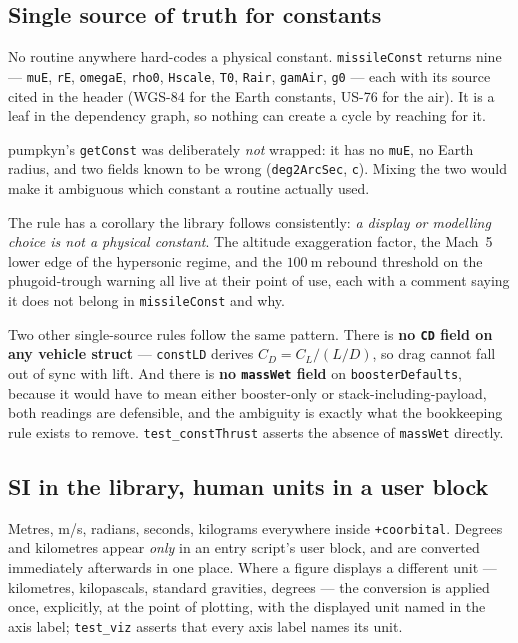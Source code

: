 \documentclass[11pt]{article}
\newcommand{\code}[1]{\texttt{#1}}
\begin{document}
\subsection{Single source of truth for constants}

No routine anywhere hard-codes a physical constant. \code{missileConst}
returns nine --- \code{muE}, \code{rE}, \code{omegaE}, \code{rho0},
\code{Hscale}, \code{T0}, \code{Rair}, \code{gamAir}, \code{g0} --- each with
its source cited in the header (WGS-84 for the Earth constants, US-76 for the
air). It is a leaf in the dependency graph, so nothing can create a cycle by
reaching for it.

pumpkyn's \code{getConst} was deliberately \emph{not} wrapped: it has no
\code{muE}, no Earth radius, and two fields known to be wrong
(\code{deg2ArcSec}, \code{c}). Mixing the two would make it ambiguous which
constant a routine actually used.

The rule has a corollary the library follows consistently: \emph{a display or
modelling choice is not a physical constant}. The altitude exaggeration factor,
the Mach~5 lower edge of the hypersonic regime, and the $100~\mathrm{m}$
rebound threshold on the phugoid-trough warning all live at their point of use,
each with a comment saying it does not belong in \code{missileConst} and why.

Two other single-source rules follow the same pattern. There is \textbf{no
\code{CD} field on any vehicle struct} --- \code{constLD} derives
$C_D = C_L/(L/D)$, so drag cannot fall out of sync with lift. And there is
\textbf{no \code{massWet} field} on \code{boosterDefaults}, because it would
have to mean either booster-only or stack-including-payload, both readings are
defensible, and the ambiguity is exactly what the bookkeeping rule exists to
remove. \code{test\_constThrust} asserts the absence of \code{massWet}
directly.

\subsection{SI in the library, human units in a user block}

Metres, m/s, radians, seconds, kilograms everywhere inside \code{+coorbital}.
Degrees and kilometres appear \emph{only} in an entry script's user block, and
are converted immediately afterwards in one place. Where a figure displays a
different unit --- kilometres, kilopascals, standard gravities, degrees --- the
conversion is applied once, explicitly, at the point of plotting, with the
displayed unit named in the axis label; \code{test\_viz} asserts that every
axis label names its unit.
\end{document}
